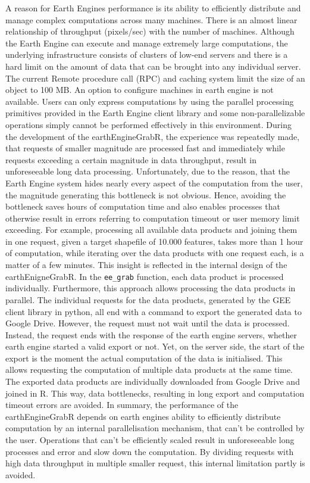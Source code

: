 \documentclass[12pt,twoside,a4paper,final]{report}
\begin{document}
A reason for Earth Engines performance is its ability to efficiently distribute and manage complex computations across many machines. There is an almost linear relationship of throughput (pixels/sec) with the number of machines.
Although the Earth Engine can execute and manage extremely large computations, the underlying infrastructure consists of clusters of low-end servers and there is a hard limit on the amount of data that can be brought into any individual server. The current Remote procedure call (RPC) and caching system limit the size of an object to 100 MB.
An option to configure machines in earth engine is not available.
Users can only express computations by using the parallel processing primitives provided in the Earth Engine client library and some non-parallelizable operations simply cannot be performed effectively in this environment.
During the development of the earthEngineGrabR, the experience was repeatedly made, that requests of smaller magnitude are processed fast and immediately while requests exceeding a certain magnitude in data throughput, result in unforeseeable long data processing. Unfortunately, due to the reason, that the Earth Engine system hides nearly every aspect of the computation from the user, the magnitude generating this bottleneck is not obvious. Hence, avoiding the bottleneck saves hours of computation time and also enables processes that otherwise result in errors referring to computation timeout or user memory limit exceeding. For example, processing all available data products and joining them in one request, given a target shapefile of 10.000 features, takes more than 1 hour of computation, while iterating over the data products with one request each, is a matter of a few minutes. This insight is reflected in the internal design of the earthEnigneGrabR. In the \texttt{ee\_grab} function, each data product is processed individually. Furthermore, this approach allows processing the data products in parallel. The individual requests for the data products, generated by the GEE client library in python, all end with a command to export the generated data to Google Drive. However, the request must not wait until the data is processed. Instead, the request ends with the response of the earth engine servers, whether earth engine started a valid export or not. Yet, on the server side, the start of the export is the moment the actual computation of the data is initialised. This allows requesting the computation of multiple data products at the same time. The exported data products are individually downloaded from Google Drive and joined in R. This way, data bottlenecks, resulting in long export and computation timeout errors are avoided. 
In summary, the performance of the earthEngineGrabR depends on earth engines ability to efficiently distribute computation by an internal parallelisation mechanism, that can't be controlled by the user. Operations that can't be efficiently scaled result in unforeseeable long processes and error and slow down the computation. By dividing requests with high data throughput in multiple smaller request, this internal limitation partly is avoided.
\end{document}
